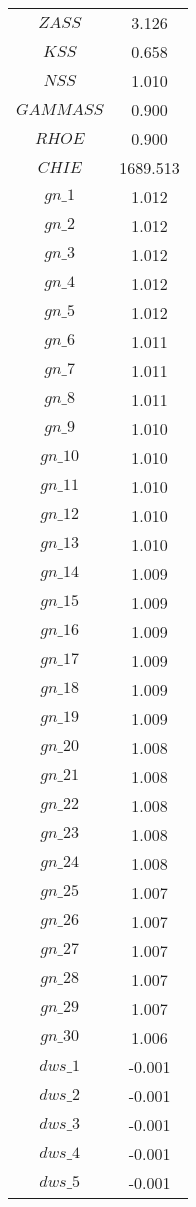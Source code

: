 \begin{center}
\begin{longtable}{cc}
$ZASS$ 	 & 	 3.126 \\
$KSS$ 	 & 	 0.658 \\
$NSS$ 	 & 	 1.010 \\
$GAMMASS$ 	 & 	 0.900 \\
$RHOE$ 	 & 	 0.900 \\
$CHIE$ 	 & 	 1689.513 \\
$gn\_1$ 	 & 	 1.012 \\
$gn\_2$ 	 & 	 1.012 \\
$gn\_3$ 	 & 	 1.012 \\
$gn\_4$ 	 & 	 1.012 \\
$gn\_5$ 	 & 	 1.012 \\
$gn\_6$ 	 & 	 1.011 \\
$gn\_7$ 	 & 	 1.011 \\
$gn\_8$ 	 & 	 1.011 \\
$gn\_9$ 	 & 	 1.010 \\
$gn\_10$ 	 & 	 1.010 \\
$gn\_11$ 	 & 	 1.010 \\
$gn\_12$ 	 & 	 1.010 \\
$gn\_13$ 	 & 	 1.010 \\
$gn\_14$ 	 & 	 1.009 \\
$gn\_15$ 	 & 	 1.009 \\
$gn\_16$ 	 & 	 1.009 \\
$gn\_17$ 	 & 	 1.009 \\
$gn\_18$ 	 & 	 1.009 \\
$gn\_19$ 	 & 	 1.009 \\
$gn\_20$ 	 & 	 1.008 \\
$gn\_21$ 	 & 	 1.008 \\
$gn\_22$ 	 & 	 1.008 \\
$gn\_23$ 	 & 	 1.008 \\
$gn\_24$ 	 & 	 1.008 \\
$gn\_25$ 	 & 	 1.007 \\
$gn\_26$ 	 & 	 1.007 \\
$gn\_27$ 	 & 	 1.007 \\
$gn\_28$ 	 & 	 1.007 \\
$gn\_29$ 	 & 	 1.007 \\
$gn\_30$ 	 & 	 1.006 \\
$dws\_1$ 	 & 	 -0.001 \\
$dws\_2$ 	 & 	 -0.001 \\
$dws\_3$ 	 & 	 -0.001 \\
$dws\_4$ 	 & 	 -0.001 \\
$dws\_5$ 	 & 	 -0.001 \\

\end{longtable}
\end{center}
